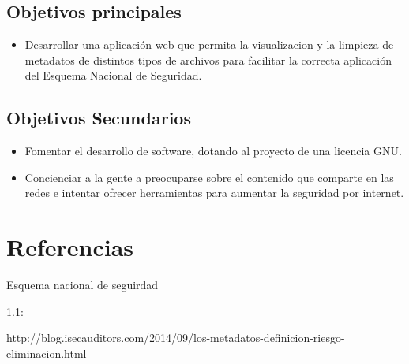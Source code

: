 \subsection{Objetivos principales}

\begin{itemize}
	\renewcommand{\labelitemi}{$\bullet$}
	\item Desarrollar una aplicación web que permita la visualizacion y la limpieza de metadatos de distintos tipos de 
	archivos para facilitar la correcta aplicación del Esquema Nacional de Seguridad.
\end{itemize}

\subsection{Objetivos Secundarios}

\begin{itemize}
	\renewcommand{\labelitemi}{$\bullet$}
	\item Fomentar el desarrollo de software, dotando al proyecto de una licencia GNU.
	\item Concienciar a la gente a preocuparse sobre el contenido que comparte en las redes e intentar ofrecer 
	herramientas para aumentar la seguridad por internet.
\end{itemize}

\section{Referencias}

Esquema nacional de seguirdad

1.1:

http://blog.isecauditors.com/2014/09/los-metadatos-definicion-riesgo-eliminacion.html